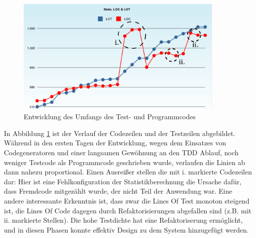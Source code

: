 \begin{figure}[htbp]
 \centering
 \includegraphics[width=0.9\textwidth]{./diagrams/itjobs-loclot.pdf}
 \caption{Entwicklung des Umfangs des Test- und Programmcodes}
 \label{fig:itjobsLoc}
\end{figure}

In Abbildung \ref{fig:itjobsLoc} ist der Verlauf der Codezeilen und der Testzeilen abgebildet. Während in den ersten Tagen der Entwicklung, wegen dem Einsatzes von Codegeneratoren und einer langsamen Gewöhnung an den TDD Ablauf, noch weniger Testcode als Programmcode geschrieben wurde, verlaufen die Linien ab dann nahezu proportional. Einen Ausreißer stellen die mit i. markierte Codezeilen dar: Hier ist eine Fehlkonfiguration der Statistikberechnung die Ursache dafür, dass Fremdcode mitgezählt wurde, der nicht Teil der Anwendung war. Eine andere interessante Erkenntnis ist, dass zwar die Lines Of Test monoton steigend ist, die Lines Of Code dagegen durch Refaktorisierungen abgefallen sind (z.B. mit ii. markierte Stellen). Die hohe Testdichte hat eine Refaktoriserung ermöglicht, und in diesen Phasen konnte effektiv Design zu dem System hinzugefügt werden.


